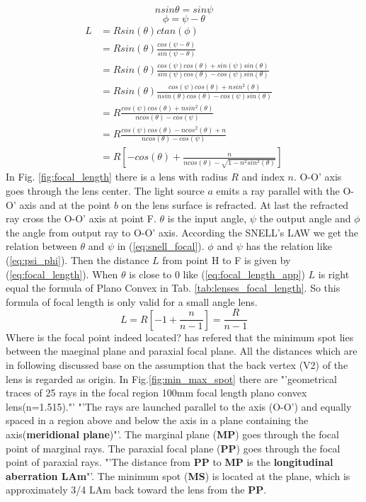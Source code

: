 \begin{equation}
nsin\theta=sin\psi
\label{eq:snell_focal}
\end{equation}
\begin{equation}
\phi=\psi-\theta
\label{eq:psi_phi}
\end{equation}
\begin{align}
L&=Rsin(\theta) ctan(\phi) \nonumber\\
&=Rsin(\theta)\frac{cos(\psi-\theta)}{ sin(\psi-\theta)} \nonumber\\
&= Rsin(\theta)\frac{cos(\psi)cos(\theta)+sin(\psi)sin(\theta)}{sin(\psi)cos(\theta)-cos(\psi)sin(\theta)} \nonumber\\
&= Rsin(\theta)\frac{cos(\psi)cos(\theta)+nsin^{2}(\theta)}{nsin(\theta)cos(\theta)-cos(\psi)sin(\theta)} \nonumber\\
&=R\frac{cos(\psi)cos(\theta)+nsin^{2}(\theta)}{ncos(\theta)-cos(\psi)} \nonumber\\
&=R\frac{cos(\psi)cos(\theta)-ncos^{2}(\theta)+n}{ncos(\theta)-cos(\psi)} \nonumber\\
&=R \left[-cos(\theta)+\frac{n}{ncos(\theta)-\sqrt{1-n^{2}sin^{2}(\theta)}} \right]
\label{eq:focal_length}
\end{align}
In Fig. \ref{fig:focal_length} there is a lens with radius $R$ and index $n$. O-O' axis goes through the lens center.  The light source $a$ emits a ray parallel with the O-O' axis and at the point $b$ on the lens surface is refracted. At last the refracted ray cross the O-O' axis at point F. $\theta$ is the input angle, $\psi$ the output angle and $\phi$ the angle from output ray to O-O' axis. According the SNELL's LAW we get the relation between $\theta$ and $\psi$ in (\ref{eq:snell_focal}). $\phi$ and $\psi$ has the relation like (\ref{eq:psi_phi}). Then the distance $L$ from point H to F is given by (\ref{eq:focal_length}). When $\theta$ is close to 0 like (\ref{eq:focal_length_app}) $L$ is right equal the formula of Plano Convex in Tab. \ref{tab:lenses_focal_length}. So this formula of focal length is only valid for a small angle lens. 
\begin{equation}
L=R\left[ -1+\frac{n}{n-1}\right]=\frac{R}{n-1}
\label{eq:focal_length_app}
\end{equation}
Where is the focal point indeed located? \cite{lens_theory_LC_Ltd} has refered that the minimum spot lies between the maeginal plane and paraxial focal plane. All the distances which are in following discussed base on the assumption that the back vertex (V2) of the lens is regarded as origin. In Fig.\ref{fig:min_max_spot} there are "'geometrical traces of 25 rays in the focal region 100mm focal length plano convex lens(n=1.515)."'  "'The rays are launched parallel to the axis (O-O') and equally spaced in a region above and below the axis in a plane containing the axis(\textbf{meridional plane})"'. The marginal plane (\textbf{MP}) goes through the focal point of marginal rays. The paraxial focal plane (\textbf{PP}) goes through the focal point of paraxial rays. "'The distance from \textbf{PP} to \textbf{MP} is the \textbf{longitudinal aberration LAm}"'. The minimum spot (\textbf{MS}) is located at the plane, which is approximately 3/4 LAm back toward the lens from the \textbf{PP}.

